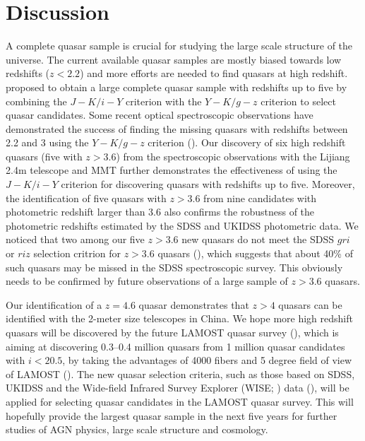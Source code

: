 \documentclass[referee]{raa}
\begin{document}
\section{Discussion}
\label{sect:discussion}
A complete quasar sample is crucial for studying the large scale structure of the universe. The current available quasar samples
are mostly  biased towards low redshifts ($z<2.2$)  and more efforts are needed to find quasars at high redshift.
 \cite{Wu+Jia+2010} proposed to obtain a large complete quasar sample with redshifts up to five by combining the  $J-K/i-Y$ criterion with the $Y-K/g-z$ criterion to select quasar candidates. Some recent
optical spectroscopic observations  have demonstrated the success of finding the missing quasars
with redshifts between 2.2 and 3 using the $Y-K/g-z$ criterion (\citealt{Wu+etal+2010a, Wu+etal+2010b, Wu+etal+2011}). Our discovery of six  high redshift quasars (five with $z>3.6$) from the spectroscopic observations with the Lijiang 2.4m telescope  and MMT further demonstrates the effectiveness of using the   $J-K/i-Y$ criterion for discovering  quasars with redshifts up to five. Moreover, the identification of five quasars with $z>3.6$ from nine candidates with photometric
redshift larger than 3.6 also confirms the robustness of the photometric redshifts estimated by the SDSS and UKIDSS photometric data.
We noticed that two among our five $z>3.6$ new quasars do not meet the SDSS $gri$ or $riz$ selection critrion for
$z>3.6$ quasars (\citealt{Fan+etal+2001a, Fan+etal+2001b, Richards+etal+2002}), which suggests that about 40\% of such quasars may be missed in the SDSS spectroscopic survey. This obviously needs to be confirmed by future observations of a large sample of $z>3.6$ quasars.

Our identification of a $z=4.6$ quasar demonstrates that $z>4$ quasars can be identified with the 2-meter size telescopes in China. We hope more high redshift
quasars will be discovered by the future LAMOST quasar survey (\citealt{Wu+2011}), which is aiming at discovering 0.3--0.4 million quasars from 1 million quasar candidates
with $i<20.5$, by taking the advantages of 4000 fibers and 5 degree field of view of LAMOST (\citealt{Su+etal+1998, Zhao+etal+2012}).
The new quasar selection criteria, such as those based on SDSS, UKIDSS and the Wide-field Infrared Survey Explorer (WISE; \citealt{Wright+etal+2010}) data (\citealt{Wu+etal+2012}), will be applied for selecting quasar candidates in the
LAMOST quasar survey. This will hopefully provide the largest quasar sample in the next five years for further studies of AGN physics, large scale structure and cosmology.
\end{document}
